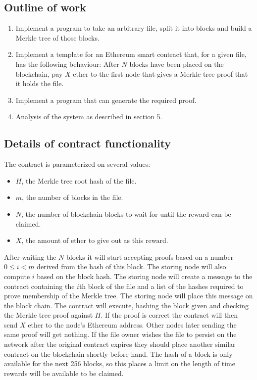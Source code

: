 \documentclass[oneside]{article}
\begin{document}
\subsection{Outline of work}
\begin{enumerate}
\item Implement a program to take an arbitrary file, split it into blocks and build a Merkle tree of those blocks.

\item Implement a template for an Ethereum smart contract that, for a given file, has the following behaviour:
After $N$ blocks have been placed on the blockchain, pay $X$ ether to the first node that gives a Merkle tree proof that it holds the file.

\item Implement a program that can generate the required proof.

\item Analysis of the system as described in section 5.
\end{enumerate}

\subsection{Details of contract functionality}

The contract is parameterized on several values:
\begin{itemize}
\item $H$, the Merkle tree root hash of the file.
\item $m$, the number of blocks in the file.
\item $N$, the number of blockchain blocks to wait for until the reward can be claimed.
\item $X$, the amount of ether to give out as this reward.
\end{itemize}

After waiting the $N$ blocks it will start accepting proofs based on a number $0 \leq i < m$ derived from the hash of this block.
The storing node will also compute $i$ based on the block hash.
The storing node will create a message to the contract containing the $i$th block of the file and a list of the hashes required to prove membership of the Merkle tree.
The storing node will place this message on the block chain.
The contract will execute, hashing the block given and checking the Merkle tree proof against $H$.
If the proof is correct the contract will then send $X$ ether to the node's Ethereum address.
Other nodes later sending the same proof will get nothing.
If the file owner wishes the file to persist on the network after the original contract expires they should place another similar contract on the blockchain shortly before hand.
The hash of a block is only available for the next 256 blocks, so this places a limit on the length of time rewards will be available to be claimed.\\
\end{document}
